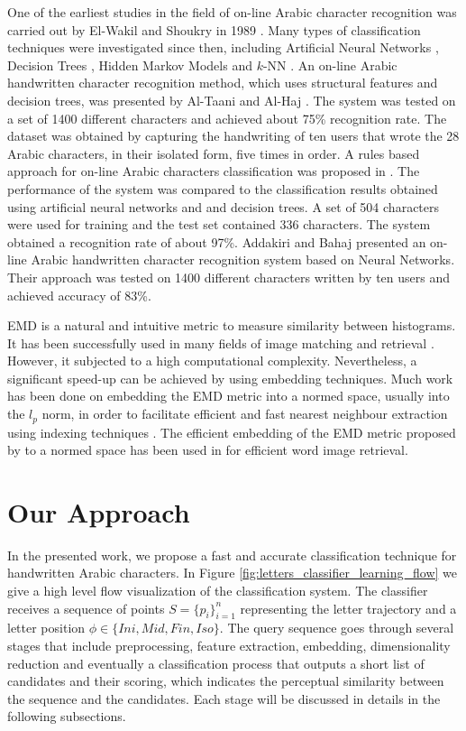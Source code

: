 \documentclass[10pt, conference, compsocconf]{IEEEtran}
\begin{document}
One of the earliest studies in the field of on-line Arabic character recognition was carried out by El-Wakil and Shoukry in 1989 \cite{el1989line}.
Many types of classification techniques were investigated since then, including Artificial Neural Networks \cite{alijla2012oiahcr,ismail2012online}, Decision Trees \cite{ismail2012online, al2010recognition, omer2010online}, Hidden Markov Models \cite{biadsy2006online} and $k$-NN \cite{elglaly2011isolated}.
An on-line Arabic handwritten character recognition method, which uses structural features and decision trees, was presented by Al-Taani and Al-Haj \cite{al2010recognition}. 
The system was tested on a set of 1400 different characters and achieved about 75\% recognition rate. 
The dataset was obtained by capturing the handwriting of ten users that wrote the 28 Arabic characters, in their isolated form, five times in order.
A rules based approach for on-line Arabic characters classification was proposed in \cite{ismail1859online}. 
The performance of the system was compared to the classification results obtained using artificial neural networks and and decision trees. 
A set of 504 characters were used for training and the test set contained 336 characters. 
The system obtained a recognition rate of about 97\%. 
Addakiri and Bahaj \cite{addakiri2012line} presented an on-line Arabic handwritten character
recognition system based on Neural Networks. 
Their approach was tested on 1400 different characters written by ten users and achieved accuracy of 83\%.

EMD is a natural and intuitive metric to measure similarity between histograms. 
It has been successfully used in many fields of image matching and retrieval \cite{grauman2004fast, rubner2000earth}.
However, it subjected to a high computational complexity.
Nevertheless, a significant speed-up can be achieved by using embedding techniques.
Much work has been done on embedding the EMD metric into a normed space, usually into the $l_p$ norm, in order to facilitate efficient and fast nearest neighbour extraction using indexing techniques \cite{bourgain1985lipschitz}. 
The efficient embedding of the EMD metric proposed by \cite{shirdhonkar2008approximate} to a normed space has been used in \cite{saabni2013efficient} for efficient word image retrieval.

\section{Our Approach}
\label{sec:approach}
In the presented work, we propose a fast and accurate classification technique for handwritten Arabic characters.
In Figure \ref{fig:letters_classifier_learning_flow} we give a high level flow visualization of the classification system.
The classifier receives a sequence of points $S=\{p_{i}\}_{i=1}^{n}$ representing the letter trajectory and a letter position $\phi \in \{Ini, Mid, Fin, Iso\}$.
The query sequence goes through several stages that include preprocessing, feature extraction, embedding, dimensionality reduction and eventually a classification process that outputs a short list of candidates and their scoring, which indicates the perceptual similarity between the sequence and the candidates. 
Each stage will be discussed in details in the following subsections.
\end{document}
